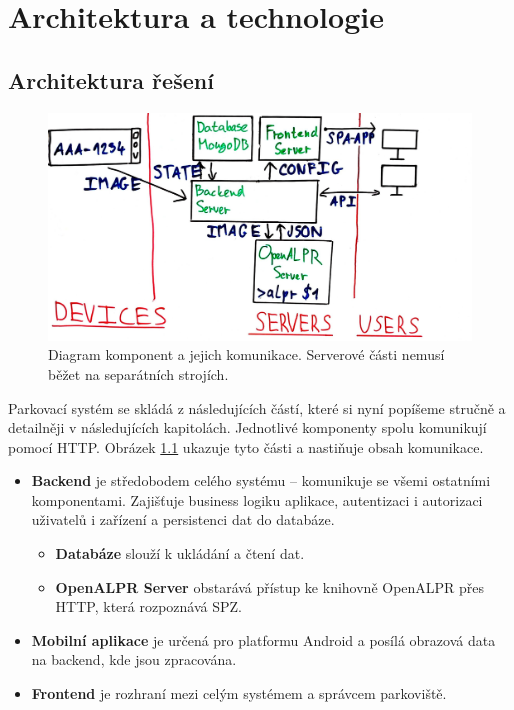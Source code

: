
\chapter{Architektura a technologie} \label{archtech}

\section{Architektura řešení} \label{architektura_reseni}

\begin{figure} \centering
  \includegraphics[width=145mm]{../img/architecture_drawing.jpg}
  \caption[Diagram komponent a jejich komunikace.]{Diagram komponent a jejich komunikace.
  Serverové části nemusí běžet na separátních strojích.}
  \label{fig:architecture_drawing}
\end{figure}

\noindent
Parkovací systém se skládá z následujících částí, které si nyní popíšeme stručně a detailněji v
následujících kapitolách.
Jednotlivé komponenty spolu komunikují pomocí HTTP.
Obrázek \ref{fig:architecture_drawing} ukazuje tyto části a nastiňuje obsah komunikace.

\begin{itemize}
  \setlength\itemsep{.05em}
  \item \textbf{Backend} je středobodem celého systému -- komunikuje se všemi ostatními komponentami.
  Zajišťuje business logiku aplikace, autentizaci i autorizaci uživatelů i zařízení
  a persistenci dat do databáze.
  \begin{itemize}
    \setlength\itemsep{.05em}
    \item \textbf{Databáze} slouží k ukládání a čtení dat.
    \item \textbf{OpenALPR Server} obstarává přístup
          ke knihovně OpenALPR přes HTTP, která rozpoznává SPZ.
  \end{itemize}
  \item \textbf{Mobilní aplikace} je určená pro platformu Android a posílá obrazová data na backend,
        kde jsou zpracována.
  \item \textbf{Frontend} je rozhraní mezi celým systémem a správcem parkoviště.
\end{itemize}

